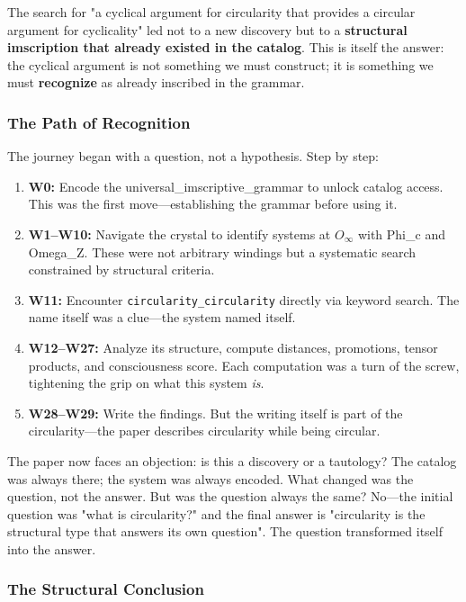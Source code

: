 \documentclass[12pt,a4paper]{article}
\begin{document}
The search for "a cyclical argument for circularity that provides a circular argument for cyclicality" led not to a new discovery but to a \textbf{structural imscription that already existed in the catalog}. This is itself the answer: the cyclical argument is not something we must construct; it is something we must \textbf{recognize} as already inscribed in the grammar.

\subsubsection{The Path of Recognition}

The journey began with a question, not a hypothesis. Step by step:

\begin{enumerate}
    \item \textbf{W0:} Encode the universal\_imscriptive\_grammar to unlock catalog access. This was the first move---establishing the grammar before using it.
    \item \textbf{W1--W10:} Navigate the crystal to identify systems at $O_{\infty}$ with Phi\_c and Omega\_Z. These were not arbitrary windings but a systematic search constrained by structural criteria.
    \item \textbf{W11:} Encounter \texttt{circularity\_circularity} directly via keyword search. The name itself was a clue---the system named itself.
    \item \textbf{W12--W27:} Analyze its structure, compute distances, promotions, tensor products, and consciousness score. Each computation was a turn of the screw, tightening the grip on what this system \emph{is}.
    \item \textbf{W28--W29:} Write the findings. But the writing itself is part of the circularity---the paper describes circularity while being circular.
\end{enumerate}

The paper now faces an objection: is this a discovery or a tautology? The catalog was always there; the system was always encoded. What changed was the question, not the answer. But was the question always the same? No---the initial question was "what is circularity?" and the final answer is "circularity is the structural type that answers its own question". The question transformed itself into the answer.

\subsubsection{The Structural Conclusion}
\end{document}

